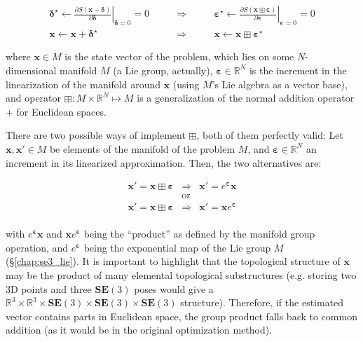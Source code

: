 \documentclass[a4paper,11pt]{report}
\newcommand{\E}{{\bm{\varepsilon}}}
\newcommand{\DEL}{{\bm{\delta}}}
\begin{document}
\begin{eqnarray}
 \DEL^\star \leftarrow
\left. \frac{\partial S(\mathbf{x} + \DEL )}{\partial \DEL } 
\right|_{\DEL=0}  = 0
 & 
\quad \quad \Longrightarrow \quad \quad 
& 
 \E^\star \leftarrow
\left. \frac{\partial S(\mathbf{x} \boxplus {\E} )}{\partial \E } 
\right|_{\E=0}  = 0
\\
 \mathbf{x} \leftarrow \mathbf{x} + \DEL^\star
 & 
\quad \quad \Longrightarrow \quad \quad 
& 
 \mathbf{x} \leftarrow \mathbf{x} \boxplus \E^\star
\end{eqnarray}

\noindent where $\mathbf{x} \in M$ is the state vector of the problem, which lies 
on some $N$-dimensional manifold $M$ (a Lie group, actually), 
$\E \in \mathbb{R}^N$ is the increment in the linearization of the manifold 
around $\mathbf{x}$ (using $M$'s Lie algebra as a vector base),
and operator $\boxplus: M \times \mathbb{R}^N \mapsto M$
is a generalization of the normal addition operator $+$ for Euclidean spaces.

There are two possible ways of implement $\boxplus$, both of them perfectly valid:
Let $\mathbf{x}, \mathbf{x}' \in M$ be elements of the manifold of the problem $M$, 
and $\E \in \mathbb{R}^N$ an increment in its linearized approximation.
Then, the two alternatives are:

\begin{eqnarray}
 \mathbf{x}' = \mathbf{x} \boxplus \E  & \Longrightarrow  & \mathbf{x}' = e^\E \mathbf{x}  \\
 & \text{or} & \\
 \mathbf{x}' = \mathbf{x} \boxplus \E  & \Longrightarrow & \mathbf{x}' = \mathbf{x} e^\E  \\
\end{eqnarray}

\noindent with $e^\E \mathbf{x}$ and $\mathbf{x} e^\E$ being the ``product'' as defined by 
the manifold group operation, and $e^\E$ being the exponential map of the Lie group $M$
(\S\ref{chap:se3_lie}). 
It is important to highlight that the topological structure of 
$\mathbf{x}$ may be the product of many elemental topological substructures 
(e.g. storing two 3D points and three $\mathbf{SE}(3)$ poses would give a 
$\mathbb{R}^3 \times \mathbb{R}^3 \times \mathbf{SE}(3) \times \mathbf{SE}(3) \times \mathbf{SE}(3)$
structure). Therefore, if the estimated vector contains parts in Euclidean space, the 
group product falls back to common addition 
(as it would be in the original optimization method).
\end{document}
